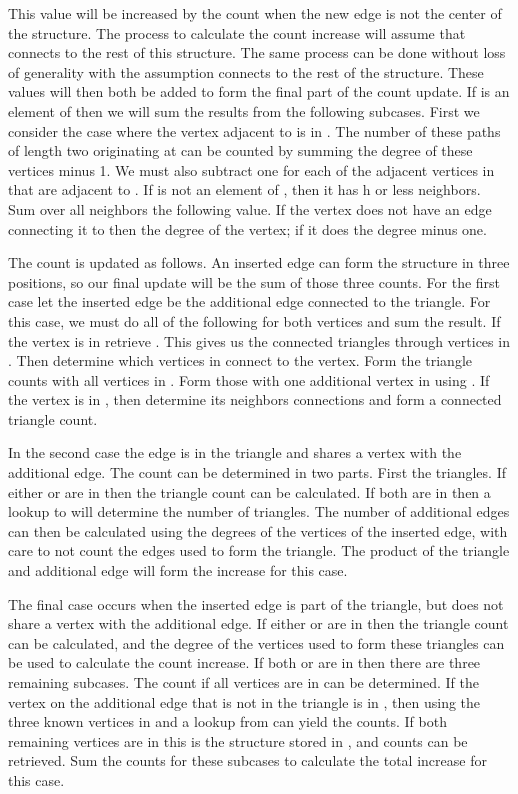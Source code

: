 \documentclass[11pt]{article}
\begin{document}
This value will be increased by the count when the new edge is not the center of the structure.  The process to calculate the count increase will assume that  connects to the rest of this structure.  The same process can be done without loss of generality with the assumption  connects to the rest of the structure.  These values will then both be added to form the final part of the count update.  If  is an element of  then we will sum the results from the following subcases.  First we consider the case where the vertex adjacent to  is in .  The number of these paths of length two originating at  can be counted by summing the degree of these vertices minus 1. We must also subtract one for each of the adjacent vertices in  that are adjacent to .  If  is not an element of , then it has h or less neighbors.  Sum over all neighbors the following value.  If the vertex does not have an edge connecting it to  then the degree of the vertex; if it does the degree minus one.


The  count is updated as follows.  An inserted edge can form the structure in three positions, so our final update will be the sum of those three counts.  For the first case let the inserted edge be the additional edge connected to the triangle.  For this case, we must do all of the following for both vertices and sum the result.  If the vertex is in  retrieve .  This gives us the connected triangles through vertices in .  Then determine which vertices in  connect to the vertex.  Form the triangle counts with all vertices in . Form those with one additional vertex in  using .  If the vertex is in , then determine its neighbors connections and form a connected triangle count.

In the second case the edge is in the triangle and shares a vertex with the additional edge.  The count can be determined in two parts.  First the triangles.  If either  or  are in  then the triangle count can be calculated.  If both are in  then a lookup to  will determine the number of triangles. The number of additional edges can then be calculated using the degrees of the vertices of the inserted edge, with care to not count the edges used to form the triangle.  The product of the triangle and additional edge will form the increase for this case.

The final case occurs when the inserted edge is part of the triangle, but does not share a vertex with the additional edge. If either  or  are in  then the triangle count can be calculated, and the degree of the vertices used to form these triangles can be used to calculate the count increase.  If both   or  are in  then there are three remaining subcases.  The count if all vertices are in  can be determined.  If the vertex on the additional edge that is not in the triangle is in , then using the three known vertices in  and a lookup from  can yield the counts.  If both remaining vertices are in  this is the structure stored in , and counts can be retrieved.  Sum the counts for these subcases to calculate the total increase for this case.
\end{document}
